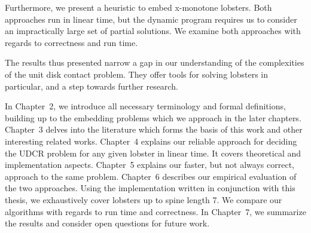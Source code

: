 Furthermore, we present a heuristic to embed x-monotone lobsters. Both approaches run in linear time, but the dynamic program requires us to consider an impractically large set of partial solutions. We examine both approaches with regards to correctness and run time.

The results thus presented narrow a gap in our understanding of the complexities of the unit disk contact problem. They offer tools for solving lobsters in particular, and a step towards further research.

In Chapter~2, we introduce all necessary terminology and formal definitions, building up to the embedding problems which we approach in the later chapters.
Chapter~3 delves into the literature which forms the basis of this work and other interesting related works.
Chapter~4 explains our reliable approach for deciding the UDCR problem for any given lobster in linear time. It covers theoretical and implementation aspects.
Chapter~5 explains our faster, but not always correct, approach to the same problem.
Chapter~6 describes our empirical evaluation of the two approaches. Using the implementation written in conjunction with this thesis, we exhaustively cover lobsters up to spine length 7. We compare our algorithms with regards to run time and correctness.
In Chapter~7, we summarize the results and consider open questions for future work.
